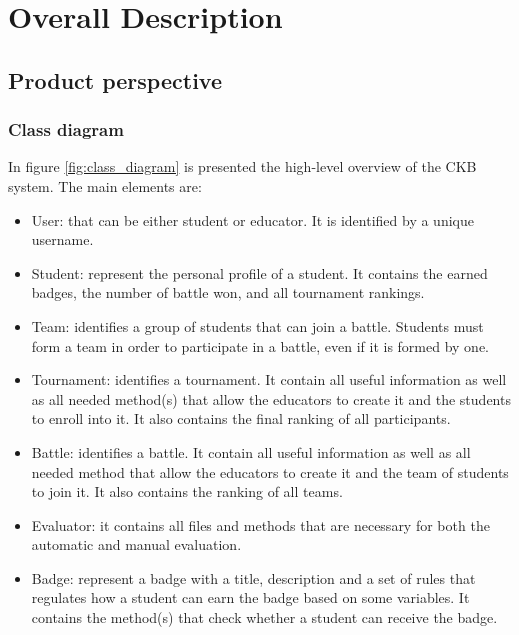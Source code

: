 \chapter{Overall Description}

\section{Product perspective}
\subsection{Class diagram}
In figure \ref{fig:class_diagram} is presented the high-level overview of the CKB system. \newline
The main elements are:
\begin{itemize}
    \item User: that can be either student or educator. It is identified by a unique username.
    \item Student: represent the personal profile of a student. It contains the earned badges, the number of battle won, and all tournament rankings.
    \item Team: identifies a group of students that can join a battle. Students must form a team in order to participate in a battle, even if it is formed by one.
    \item Tournament: identifies a tournament. It contain all useful information as well as all needed method(s) that allow the educators to create it and the students to enroll into it. It also contains the final ranking of all participants.
    \item Battle: identifies a battle. It contain all useful information as well as all needed method that allow the educators to create it and the team of students to join it. It also contains the ranking of all teams.
    \item Evaluator: it contains all files and methods that are necessary for both the automatic and manual evaluation.
    \item Badge: represent a badge with a title, description and a set of rules that regulates how a student can earn the badge based on some variables. It contains the method(s) that check whether a student can receive the badge.
\end{itemize}

